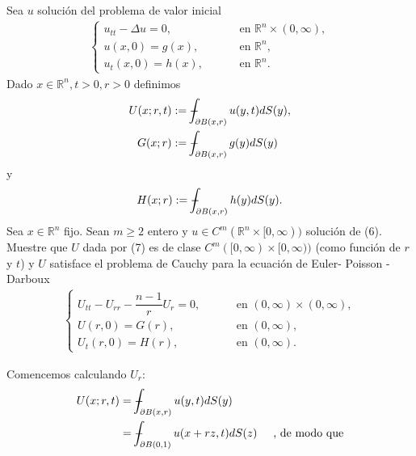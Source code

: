 \begin{homeworkProblem}
  Sea $u$ solución del problema de valor inicial
  \begin{align}
    \begin{cases}
      u_{tt} - \Delta u = 0, \hspace{1cm} & \text{en } \mathbb{R}^{n} \times (0, \infty),\\ 
      u(x,0) = g(x), \hspace{1cm} & \text{en } \mathbb{R}^{n},\\
      u_{t} (x,0) =h(x), \hspace{1cm} & \text{en } \mathbb{R}^{n}.
    \end{cases}
  \end{align}
  Dado $x \in \mathbb{R}^{n}, t>0, r>0$ definimos
  \begin{align*}
    U(x;r,t) &:= \dashint _{\partial B(x,r)} u(y,t) dS(y),\\ 
    G(x;r) &:= \dashint _{\partial B(x,r)} g(y) dS(y)
   \end{align*}
   y
   \begin{align*}
    H(x;r) := \dashint _{\partial B(x,r)} h(y) dS(y).
   \end{align*}
   Sea $x \in \mathbb{R}^{n}$ fijo. Sean $m \geq 2$ entero y $u \in C^{m} (\mathbb{R}^{n} \times [0, \infty))$ solución de (6). Muestre que $U$ dada por (7) es de clase $C^{m}([0, \infty) \times [0, \infty))$ (como función de $r$ y $t$) y $U$ satisface el problema de Cauchy para la ecuación de Euler- Poisson -Darboux
   \begin{align*}
    \begin{cases}
    U_{tt} - U_{rr} - \dfrac{n-1}{r} U_{r} = 0, \hspace{1cm} & \text{en } (0, \infty) \times (0, \infty),\\ 
    U(r,0) = G(r), \hspace{1cm} & \text{en } (0, \infty),\\
    U_{t} (r,0) =H(r), \hspace{1cm} & \text{en } (0, \infty).
    \end{cases}
  \end{align*}
  \begin{solucion}
    Comencemos calculando $U_{r}$:
    \begin{align*}
      U(x;r,t) &= \dashint _{\partial B(x,r)} u(y,t) dS(y) \\ 
      &= \dashint _{\partial B(0,1)} u(x+rz, t)dS(z) \hspace{0.5cm} \text{, de modo que}\\

\end{align*}
\end{solucion}
\end{homeworkProblem}
